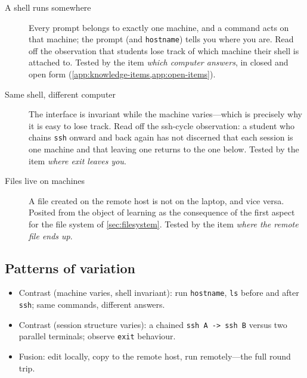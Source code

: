 \begin{description}
  \item[A shell runs somewhere]
    Every prompt belongs to exactly one machine, and a command acts on
    that machine; the prompt (and \texttt{hostname}) tells you where you
    are.
    Read off the observation that students lose track of which machine
    their shell is attached to.
    Tested by the item \emph{which computer answers}, in closed and open
    form (\cref{app:knowledge-items,app:open-items}).
  \item[Same shell, different computer]
    The interface is invariant while the machine varies---which is
    precisely why it is easy to lose track.
    Read off the ssh-cycle observation: a student who chains
    \texttt{ssh} onward and back again has not discerned that each
    session is one machine and that leaving one returns to the one
    below.
    Tested by the item \emph{where exit leaves you}.
  \item[Files live on machines]
    A file created on the remote host is not on the laptop, and vice
    versa.
    Posited from the object of learning as the consequence of the first
    aspect for the file system of \cref{sec:filesystem}.
    Tested by the item \emph{where the remote file ends up}.
\end{description}

\subsection{Patterns of variation}

\begin{itemize}
  \item Contrast (machine varies, shell invariant): run
    \texttt{hostname}, \texttt{ls} before and after \texttt{ssh}; same
    commands, different answers.
  \item Contrast (session structure varies): a chained
    \texttt{ssh A -> ssh B} versus two parallel terminals; observe
    \texttt{exit} behaviour.
  \item Fusion: edit locally, copy to the remote host, run remotely---the
    full round trip.
\end{itemize}
